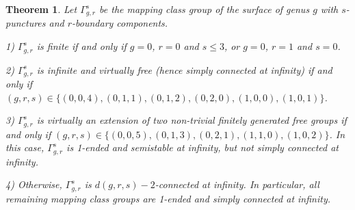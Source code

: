 \documentclass[12pt]{article}
\newtheorem{theorem}{Theorem}[subsection]
\begin{document}
 \begin{theorem}\label{MCGSCINF}
 Let $\Gamma_{g,r}^s$ be the mapping class group of the surface of genus $g$ with $s$-punctures and $r$-boundary components. 
 
1)  $\Gamma_{g,r}^s$ is finite if and only if $g=0$, $r=0$ and $s\leq 3$,  or $g=0$, $r=1$ and $s=0$. 



2) $\Gamma_{g,r}^s$ is infinite and virtually free (hence simply connected at infinity) if and only if $(g,r,s) \in \{ (0,0,4), (0,1,1),  (0,1,2), (0,2,0), (1,0,0), (1,0,1) \}$. 

3) $\Gamma_{g,r}^s$ is virtually an extension of two non-trivial finitely generated free groups  if and only if $(g,r,s) \in \{(0,0,5), (0,1,3), (0,2,1), (1,1,0), (1,0,2) \}$. In this case, $\Gamma_{g,r}^s$ is 1-ended and semistable at infinity, but not simply connected at infinity. 

4) Otherwise, $\Gamma_{g,r}^s$ is $d(g,r,s)-2$-connected at infinity. In particular, all remaining mapping class groups  are 1-ended and simply connected at infinity. 
 \end{theorem}
\end{document}
